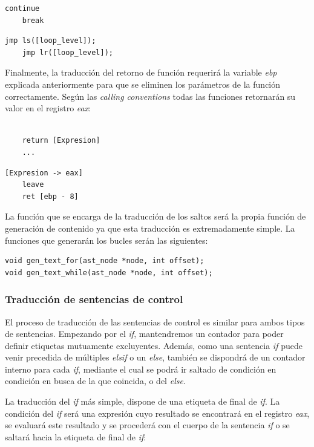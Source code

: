 \documentclass[a4paper,10pt]{article}
\begin{document}
\begin{multicols}{2}
\begin{lstlisting}[language=jam,frame=single]
	continue
	break
\end{lstlisting}
\begin{lstlisting}[frame=single]
	jmp ls([loop_level]);
	jmp lr([loop_level]);
\end{lstlisting}
\end{multicols}

Finalmente, la traducción del retorno de función requerirá la variable \textit{ebp} explicada anteriormente para que se eliminen los parámetros de la función correctamente. Según las \emph{calling conventions} todas las funciones retornarán su valor en el registro \textit{eax}:

\begin{multicols}{2}
\begin{lstlisting}[language=jam,frame=single]

	return [Expresion]
	...
\end{lstlisting}
\begin{lstlisting}[frame=single]
	[Expresion -> eax]
	leave
	ret [ebp - 8]
\end{lstlisting}
\end{multicols}
La función que se encarga de la traducción de los saltos será la propia función de generación de contenido ya que esta traducción es extremadamente simple. La funciones que generarán los bucles serán las siguientes:

\begin{lstlisting}
void gen_text_for(ast_node *node, int offset);
void gen_text_while(ast_node *node, int offset);
\end{lstlisting} 
\subsubsection{Traducción de sentencias de control}

El proceso de traducción de las sentencias de control es similar para ambos tipos de sentencias. Empezando por el \textit{if}, mantendremos un contador para poder definir etiquetas mutuamente excluyentes. Además, como una sentencia \textit{if} puede venir precedida de múltiples \textit{elsif} o un \textit{else}, también se dispondrá de un contador interno para cada \textit{if}, mediante el cual se podrá ir saltado de condición en condición en busca de la que coincida, o del \textit{else}.

La traducción del \textit{if} más simple, dispone de una etiqueta de final de \textit{if}. La condición del \textit{if} será una expresión cuyo resultado se encontrará en el registro \textit{eax}, se evaluará este resultado y se procederá con el cuerpo de la sentencia \textit{if} o se saltará hacia la etiqueta de final de \textit{if}:
\end{document}
